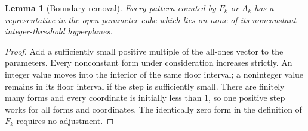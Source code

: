 \documentclass[11pt,letterpaper]{article}
\numberwithin{equation}{section}
\newtheorem{lemma}[theorem]{Lemma}
\theoremstyle{definition}
\theoremstyle{remark}
\newcommand{\1}{\mathbf 1}
\begin{document}
\begin{lemma}[Boundary removal]\label{gsr:fp:04:pat:boundary}
Every pattern counted by $F_k$ or $A_k$ has a representative in the open
parameter cube which lies on none of its nonconstant integer-threshold
hyperplanes.
\end{lemma}
\begin{proof}
Add a sufficiently small positive multiple of the all-ones vector to
the parameters. Every nonconstant form under consideration increases
strictly. An integer value moves into the interior of the same floor
interval; a noninteger value remains in its floor interval if the step
is sufficiently small. There are finitely many forms and every coordinate
is initially less than $1$, so one positive step works for all forms
and coordinates. The identically zero form in the definition of $F_k$
requires no adjustment.
\end{proof}
\end{document}
